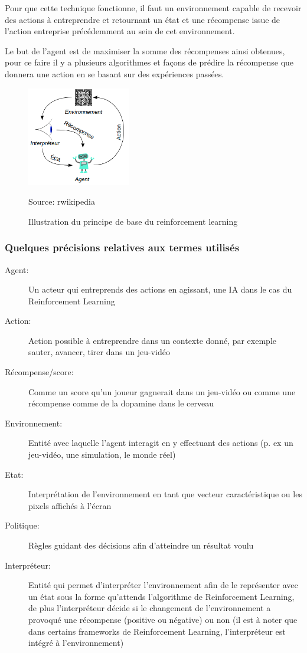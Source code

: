 \documentclass[a4paper,10pt,openany,oneside]{report}
\newcommand{\source}[1]{\caption*{Source: {#1}} }
\begin{document}
Pour que cette technique fonctionne, il faut un environnement capable de recevoir des actions à entreprendre et retournant un état et une récompense issue de l'action entreprise précédemment au sein de cet environnement.

Le but de l'agent est de maximiser la somme des récompenses ainsi obtenues, pour ce faire il y a plusieurs algorithmes et façons de prédire la récompense que donnera une action en se basant sur des expériences passées.
\begin{figure}[H]
	\centering
	\includegraphics[width=0.4\textwidth]{img/rl_schema.png}
	\caption{Illustration du principe de base du reinforcement learning \cite[]{wikipediaRL}}
	\source{rwikipedia}
\end{figure}
\subsubsection*{Quelques précisions relatives aux termes utilisés}
\begin{description}
	\item[Agent:] Un acteur qui entreprends des actions en agissant, une IA dans le cas du Reinforcement Learning
	\item[Action:] Action possible à entreprendre dans un contexte donné, par exemple sauter, avancer, tirer dans un jeu-vidéo
	\item[Récompense/score:] Comme un score qu'un joueur gagnerait dans un jeu-vidéo ou comme une récompense comme de la dopamine dans le cerveau
	\item[Environnement:] Entité avec laquelle l'agent interagit en y effectuant des actions (p. ex un jeu-vidéo, une simulation, le monde réel) 
	\item[Etat:] Interprétation de l'environnement en tant que vecteur caractéristique ou les pixels affichés à l'écran 
	\item[Politique:] Règles guidant des décisions afin d'atteindre un résultat voulu 
	\item[Interpréteur:] Entité qui permet d'interpréter l'environnement afin de le représenter avec un état sous la forme qu'attends l'algorithme de Reinforcement Learning, de plus l'interpréteur décide si le changement de l'environnement a provoqué une récompense (positive ou négative) ou non (il est à noter que dans certains frameworks de Reinforcement Learning, l'interpréteur est intégré à l'environnement)
\end{description}
\end{document}
